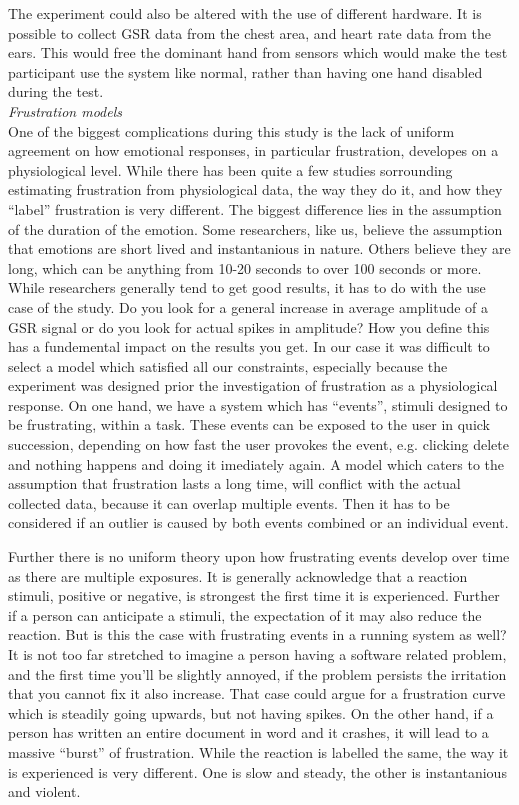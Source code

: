 The experiment could also be altered with the use of different hardware. It is possible to collect GSR data from the chest area, and heart rate data from the ears. This would free the dominant hand from sensors which would make the test participant use the system like normal, rather than having one hand disabled during the test.\\

\textit{Frustration models}\\
One of the biggest complications during this study is the lack of uniform agreement on how emotional responses, in particular frustration, developes on a physiological level. While there has been quite a few studies sorrounding estimating frustration from physiological data, the way they do it, and how they ``label'' frustration is very different.
The biggest difference lies in the assumption of the duration of the emotion. 
Some researchers, like us, believe the assumption that emotions are short lived and instantanious in nature. 
Others believe they are long, which can be anything from 10-20 seconds to over 100 seconds or more. 
While researchers generally tend to get good results, it has to do with the use case of the study. 
Do you look for a general increase in average amplitude of a GSR signal or do you look for actual spikes in amplitude? 
How you define this has a fundemental impact on the results you get. 
In our case it was difficult to select a model which satisfied all our constraints, especially because the experiment was designed prior the investigation of frustration as a physiological response. 
On one hand, we have a system which has ``events'', stimuli designed to be frustrating, within a task. These events can be exposed to the user in quick succession, depending on how fast the user provokes the event, e.g. clicking delete and nothing happens and doing it imediately again. 
A model which caters to the assumption that frustration lasts a long time, will conflict with the actual collected data, because it can overlap multiple events. Then it has to be considered if an outlier is caused by both events combined or an individual event. 

Further there is no uniform theory upon how frustrating events develop over time as there are multiple exposures. It is generally acknowledge that a reaction stimuli, positive or negative, is strongest the first time it is experienced. Further if a person can anticipate a stimuli, the expectation of it may also reduce the reaction. But is this the case with frustrating events in a running system as well? It is not too far stretched to imagine a person having a software related problem, and the first time you'll be slightly annoyed, if the problem persists the irritation that you cannot fix it also increase. That case could argue for a frustration curve which is steadily going upwards, but not having spikes.
On the other hand, if a person has written an entire document in word and it crashes, it will lead to a massive ``burst'' of frustration. 
While the reaction is labelled the same, the way it is experienced is very different. One is slow and steady, the other is instantanious and violent.

